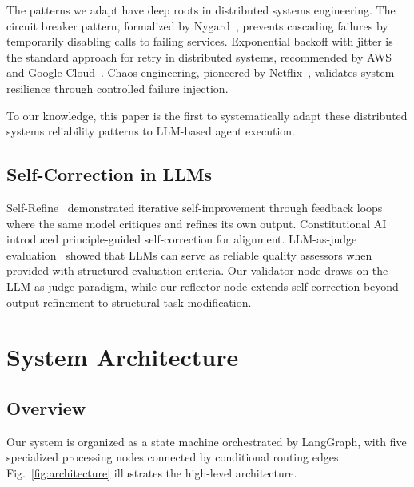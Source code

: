 \documentclass[conference]{IEEEtran}
\begin{document}
The patterns we adapt have deep roots in distributed systems engineering. The circuit breaker pattern, formalized by Nygard~\cite{nygard2007release}, prevents cascading failures by temporarily disabling calls to failing services. Exponential backoff with jitter is the standard approach for retry in distributed systems, recommended by AWS~\cite{aws_backoff2024} and Google Cloud~\cite{gcloud_retry2024}. Chaos engineering, pioneered by Netflix~\cite{basiri2016chaos}, validates system resilience through controlled failure injection.

To our knowledge, this paper is the first to systematically adapt these distributed systems reliability patterns to LLM-based agent execution.

\subsection{Self-Correction in LLMs}

Self-Refine~\cite{madaan2023self} demonstrated iterative self-improvement through feedback loops where the same model critiques and refines its own output. Constitutional AI~\cite{bai2022constitutional} introduced principle-guided self-correction for alignment. LLM-as-judge evaluation~\cite{zheng2023judging} showed that LLMs can serve as reliable quality assessors when provided with structured evaluation criteria. Our validator node draws on the LLM-as-judge paradigm, while our reflector node extends self-correction beyond output refinement to structural task modification.

\section{System Architecture}

\subsection{Overview}

Our system is organized as a state machine orchestrated by LangGraph, with five specialized processing nodes connected by conditional routing edges. Fig.~\ref{fig:architecture} illustrates the high-level architecture.
\end{document}
